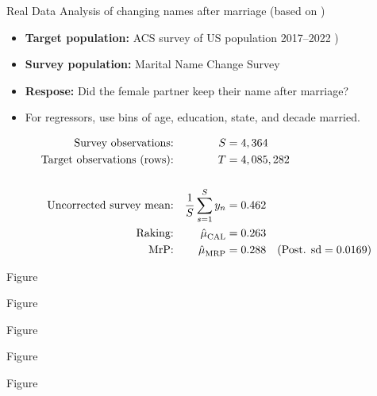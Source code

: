 \begin{frame}{Real Data}
Analysis of changing names after marriage (based on \citet{alexander:2019:namechange})

\begin{itemize}
    \item \textbf{Target population:} ACS survey of US population 2017--2022 \citep{ipumsusa})
    \item \textbf{Survey population:} Marital Name Change Survey \citep{cohen:2019:namechange}
    \item \textbf{Respose:}  Did the female partner keep their name after marriage?
    \item For regressors, use bins of age, education, state, and decade married.
\end{itemize}

$$
\begin{aligned}
    \textrm{Survey observations:} &&  S ={}& 4,364  \\
    \textrm{Target observations (rows):} &&  T ={}& 4,085,282 \\
    \\
    \textrm{Uncorrected survey mean:} && \frac{1}{S} \sum_{s=1}^S y_n ={}& 0.462 \\
    \textrm{Raking:} && \hat{\mu}^{}_{\mathrm{CAL}} ={}& 0.263 \\
    \textrm{MrP:} && \hat{\mu}^{}_{\mathrm{MRP}} ={}& 0.288
        \quad(\textrm{Post. sd} = 0.0169)\\
\end{aligned}
$$
%
\end{frame}


\begin{frame}{Figure}
\AlexanderImbalancePrimary{}
\end{frame}


\begin{frame}{Figure}
\AlexanderImbalanceInteraction{}
\end{frame}


\begin{frame}{Figure}
    \AlexanderPredictionFig{}
\end{frame}



\begin{frame}{Figure}
    \AlexanderPredictionFigTwo{}
\end{frame}




\begin{frame}{Figure}
    \AlexanderPredictionFigThree{}
\end{frame}

